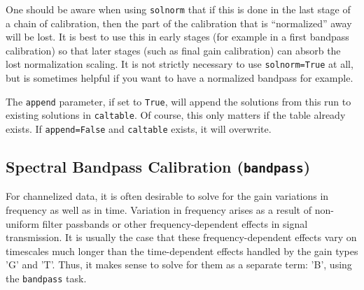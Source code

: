 One should be aware when using {\tt solnorm} that if this is done
in the last stage of a chain of calibration, then the part of 
the calibration that is ``normalized'' away will be lost.  It is
best to use this in early stages (for example in a first bandpass
calibration) so that later stages (such as final gain calibration)
can absorb the lost normalization scaling.  It is not strictly
necessary to use {\tt solnorm=True} at all, but is sometimes helpful
if you want to have a normalized bandpass for example.

The {\tt append} parameter, if set to {\tt True}, will append the
solutions from this run to existing solutions in {\tt caltable}.
Of course, this only matters if the table already exists.  If
{\tt append=False} and {\tt caltable} exists, it will overwrite.

\subsection{Spectral Bandpass Calibration ({\tt bandpass})}
\label{section:cal.solve.band}

For channelized data, it is often desirable to solve for the gain
variations in frequency as well as in time.  Variation in frequency
arises as a result of non-uniform filter passbands or other frequency-dependent
effects in signal transmission.  It is usually the case that these
frequency-dependent effects vary on timescales much longer than the
time-dependent effects handled by the gain types 'G' and 'T'.  
Thus, it makes sense to solve for them as a separate term: 'B', using the
{\tt bandpass} task.

